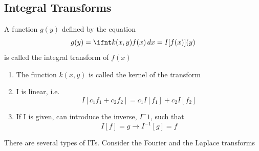 \documentclass[a4paper, 11pt, normalem]{report}
\begin{document}
\chapter{}
\section{Integral Transforms}
A function $g(y)$ defined by the equation
\begin{equation*}
    g(y) = \ifnt k(x,y)f(x)\,dx = I[f(x)](y)
\end{equation*}
is called the integral transform of $f(x)$
\begin{enumerate}
    \item The function $k(x,y)$ is called the kernel of the transform
    \item I is linear, i.e.
            \begin{equation*}
                I[c_1 f_1 + c_2 f_2] = c_1 I[f_1] + c_2 I[f_2]
            \end{equation*}
    \item If I is given, can introduce the inverse, $I^-1$, such that
            \begin{equation*}
                I[f] = g \to I^{-1}[g] = f
            \end{equation*}
\end{enumerate}
There are several types of ITs. Consider the Fourier and the Laplace transforms
\end{document}
